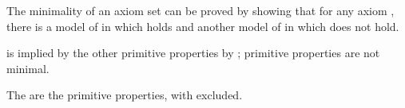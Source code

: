 \documentclass[b5paper, english, oneside]{memoir}
\begin{document}
\begin{note}
\label{ProvingMinimality}
The minimality of an axiom set  can be proved by showing that for any axiom , there is a model of  in which  holds and another model of  in which  does not hold.
\end{note}

\begin{note}
 is implied by the other primitive properties by ; primitive properties are not minimal.
\end{note}

\begin{note}
The  are the primitive properties, with  excluded.
\end{note}
\end{document}
